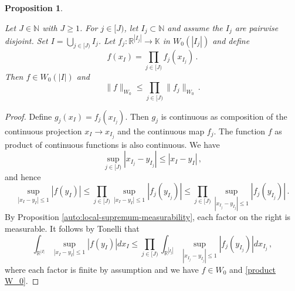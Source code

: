 \documentclass[12pt,reqno]{amsart}
\theoremstyle{plain}
\newtheorem{proposition}[theorem]{Proposition}
\numberwithin{equation}{section}
\theoremstyle{remark}
\newcommand{\uses}[1]{}
\newcommand{\usesdefs}[1]{}
\newcommand{\leanok}{}
\newcommand{\lean}[1]{}
\newcommand{\R}{{\mathbb R}}
\newcommand{\N}{{\mathbb N}}
\begin{document}
\begin{proposition}\label{tensor Wiener}\uses{auto:local-supremum-measurability}\usesdefs{auto:Wiener-space-definition}
\lean{Auto.MemW0.fintype_tensor,Auto.fintype_tensor_wienerNorm_le}
\leanok
    Let $J\in \N$ with $J\ge 1$. For $j\in [J)$, let $I_j\subset \N$ and assume the $I_j$ are pairwise disjoint.
    Set $I=\bigcup_{j\in [J)}I_j$. Let $f_j:\R^{|I_j|}\to \mathbb{K}$ in $W_0(|I_j|)$ and define
    \begin{equation}\label{auto:Wiener-product-function}
        f(x_I)=\prod_{j\in [J)}f_j(x_{I_j})\, .
    \end{equation}
    Then $f\in W_0(|I|)$ and
    \begin{equation}\label{product W_0}
        \|f\|_{W_0}\le \prod_{j\in [J)}\|f_j\|_{W_0}\, .
    \end{equation}
\end{proposition}
\begin{proof}
    Define $g_j(x_I)=f_j(x_{I_j})$. Then $g_j$ is continuous as composition of the continuous
    projection $x_I\to x_{I_j}$ and the continuous map $f_j$. The function $f$ as product of
    continuous functions is also continuous.
We have
\begin{equation}
     \sup_{j\in [J)} |x_{I_j}-y_{I_j}|\le |x_I-y_I|\, ,
\end{equation}
and hence
\begin{equation}
    \sup_{|x_I-y_I|\le 1}|f(y_I)|\le \prod_{j\in [J)} \sup_{|x_{I}-y_{I}|\le 1}|f_j(y_{I_j})|\le
    \prod_{j\in [J)} \sup_{|x_{I_j}-y_{I_j}|\le 1}|f_j(y_{I_j})|\, .
\end{equation}
By Proposition \ref{auto:local-supremum-measurability}, each factor on the right is measurable. It follows by Tonelli that
\begin{equation}
    \int_{\R^{|I|}}\sup_{|x_I-y_I|\le 1}|f(y_I)|dx_I\le
    \prod_{j\in [J)} \int_{\R^{|I_j|}}\sup_{|x_{I_j}-y_{I_j}|\le 1}|f_j(y_{I_j})|dx_{I_j}\, ,
\end{equation}
    where each factor is finite by assumption and we have $f\in W_0$ and \eqref{product W_0}.
\end{proof}
\end{document}
